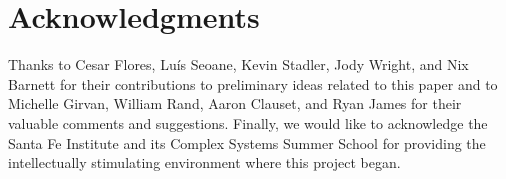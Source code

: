 \documentclass{article}
\begin{document}
\section{Acknowledgments}

Thanks to Cesar Flores, Lu\'is Seoane, Kevin Stadler, Jody Wright, and Nix Barnett for their contributions to preliminary ideas related to this paper and to Michelle Girvan, William Rand, Aaron Clauset, and Ryan James for their valuable comments and suggestions. Finally, we would like to acknowledge the Santa Fe Institute and its Complex Systems Summer School for providing the intellectually stimulating environment where this project began.





%



% 
\end{document}
